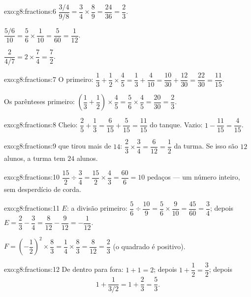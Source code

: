 \begin{solution}{exo:g8:fractions:6}
$\dfrac{3/4}{9/8} = \dfrac34 \times \dfrac89 = \dfrac{24}{36} =
\dfrac23$.

$\dfrac{5/6}{10} = \dfrac56 \times \dfrac{1}{10} = \dfrac{5}{60} =
\dfrac{1}{12}$.

$\dfrac{2}{4/7} = 2 \times \dfrac74 = \dfrac72$.
\end{solution}

\begin{solution}{exo:g8:fractions:7}
O  primeiro:
$\dfrac13 + \dfrac12 \times \dfrac45 = \dfrac13 + \dfrac{4}{10}
= \dfrac{10}{30} + \dfrac{12}{30} = \dfrac{22}{30} = \dfrac{11}{15}$.

Os parênteses primeiro:
$\left(\dfrac13 + \dfrac12\right) \times \dfrac45
= \dfrac56 \times \dfrac45 = \dfrac{20}{30} = \dfrac23$.
\end{solution}

\begin{solution}{exo:g8:fractions:8}
Cheio: $\dfrac25 + \dfrac13 = \dfrac{6}{15} + \dfrac{5}{15} =
\dfrac{11}{15}$ do tanque. Vazio:
$1 - \dfrac{11}{15} = \dfrac{4}{15}$.
\end{solution}

\begin{solution}{exo:g8:fractions:9}
 que tirou mais de $14$:
$\dfrac23 \times \dfrac34 = \dfrac{6}{12} = \dfrac12$ da turma. Se isso
são $12$ alunos, a turma tem $24$ alunos.
\end{solution}

\begin{solution}{exo:g8:fractions:10}
$\dfrac{15}{2} \div \dfrac34 = \dfrac{15}{2} \times \dfrac43
= \dfrac{60}{6} = 10$ pedaços --- um número inteiro, sem desperdício
de corda.
\end{solution}

\begin{solution}{exo:g8:fractions:11}
$E$: a divisão primeiro:
$\dfrac56 \div \dfrac{10}{9} = \dfrac56 \times \dfrac{9}{10}
= \dfrac{45}{60} = \dfrac34$; depois
$E = \dfrac23 - \dfrac34 = \dfrac{8}{12} - \dfrac{9}{12} =
-\dfrac{1}{12}$.

$F = \left(-\dfrac12\right)^2 \times \dfrac83 = \dfrac14 \times
\dfrac83 = \dfrac{8}{12} = \dfrac23$ (o quadrado é positivo).
\end{solution}

\begin{solution}{exo:g8:fractions:12}
De dentro para fora: $1 + 1 = 2$; depois $1 + \dfrac12 = \dfrac32$;
depois
\[
1 + \frac{1}{3/2} = 1 + \frac23 = \frac53 .
\]
\end{solution}

